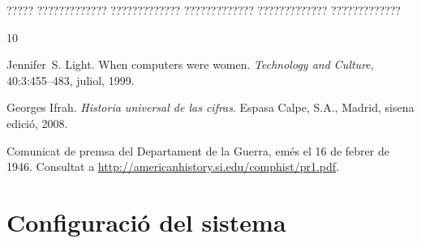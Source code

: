 \documentclass[11pt,catalan,listoffigures,listoftables]{tfgetsinf}
\begin{document}
????? ????????????? ????????????? ????????????? ????????????? ????????????? 


\begin{thebibliography}{10}

   Jennifer~S. Light.
   \newblock When computers were women.
   \newblock \textit{Technology and Culture}, 40:3:455--483, juliol, 1999.

   Georges Ifrah.
   \newblock \textit{Historia universal de las cifras}.
   \newblock Espasa Calpe, S.A., Madrid, sisena edició, 2008.

   Comunicat de premsa del Departament de la Guerra, 
   emés el 16 de febrer de 1946. 
   \newblock Consultat a 
   \url{http://americanhistory.si.edu/comphist/pr1.pdf}.

\end{thebibliography}
\cleardoublepage


\APPENDIX


\chapter{Configuració del sistema}
\end{document}
